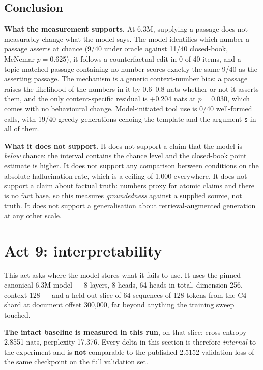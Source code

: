 \documentclass[11pt,a4paper]{article}
\begin{document}
\subsection{Conclusion}
\label{sec:act8-conclusion}

\textbf{What the measurement supports.} At 6.3M, supplying a passage does not
measurably change what the model says. The model identifies which number a
passage asserts at chance (9/40 under oracle against 11/40 closed-book, McNemar
$p = 0.625$), it follows a counterfactual edit in 0 of 40 items, and a
topic-matched passage containing no number scores exactly the same 9/40 as the
asserting passage. The mechanism is a generic context-number bias: a passage
raises the likelihood of the numbers in it by 0.6--0.8 nats whether or not it
asserts them, and the only content-specific residual is $+0.204$ nats at
$p = 0.030$, which comes with no behavioural change. Model-initiated tool use
is 0/40 well-formed calls, with 19/40 greedy generations echoing the
template and the argument \texttt{s} in all of them.

\textbf{What it does not support.} It does not support a claim that the model
is \emph{below} chance: the interval contains the chance level and the
closed-book point estimate is higher. It does not support any comparison
between conditions on the absolute hallucination rate, which is a ceiling of
1.000 everywhere. %
 It does not support a claim about factual truth: numbers proxy
for atomic claims and there is no fact base, so this measures
\emph{groundedness} against a supplied source, not truth. It does not support a
generalisation about retrieval-augmented generation at any other scale.

\section{Act 9: interpretability}
\label{sec:act9}

This act asks where the model stores what it fails to use. It uses the pinned
canonical 6.3M model --- 8 layers, 8 heads, 64 heads in total, dimension 256,
context 128 --- and a held-out slice of 64 sequences of 128 tokens from the C4
shard at document offset 300,000, far beyond anything the training sweep
touched.

\textbf{The intact baseline is measured in this run}, on that slice:
cross-entropy 2.8551 nats, perplexity 17.376. Every delta in this section is
therefore \emph{internal} to the experiment and is \textbf{not} comparable to
the published 2.5152 validation loss of the same checkpoint on the full
validation set. %
\end{document}
